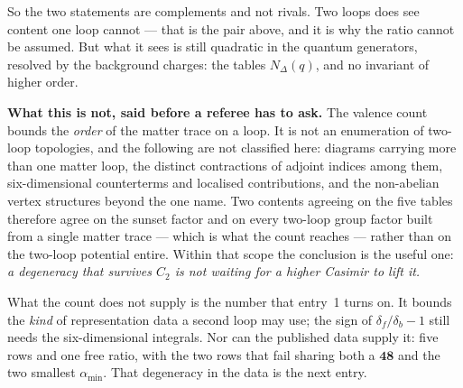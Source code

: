 \documentclass[11pt,a4paper]{article}
\newcommand{\rep}[1]{\mathbf{#1}}
\newcommand{\amin}{\alpha_{\min}}
\begin{document}
So the two statements are complements and not rivals. Two loops does see content one loop cannot ---
that is the pair above, and it is why the ratio cannot be assumed. But what it sees is still
quadratic in the quantum generators, resolved by the background charges: the tables $N_\Delta(q)$,
and no invariant of higher order.

\textbf{What this is not, said before a referee has to ask.} The valence count bounds the
\emph{order} of the matter trace on a loop. It is not an enumeration of two-loop topologies, and the
following are not classified here: diagrams carrying more than one matter loop, the distinct
contractions of adjoint indices among them, six-dimensional counterterms and localised
contributions, and the non-abelian vertex structures beyond the one \cite{HMTY} name. Two contents
agreeing on the five tables therefore agree on the sunset factor and on every two-loop group factor
built from a single matter trace --- which is what the count reaches --- rather than on the two-loop
potential entire. Within that scope the conclusion is the useful one: \emph{a degeneracy that
survives $C_2$ is not waiting for a higher Casimir to lift it.}

What the count does not supply is the number that entry~1 turns on. It bounds the \emph{kind} of
representation data a second loop may use; the sign of $\delta_f/\delta_b-1$ still needs the
six-dimensional integrals. Nor can the published data supply it: five rows and one free ratio, with
the two rows that fail sharing both a $\rep{48}$ and the two smallest $\amin$. That degeneracy in
the data is the next entry.
\end{document}
